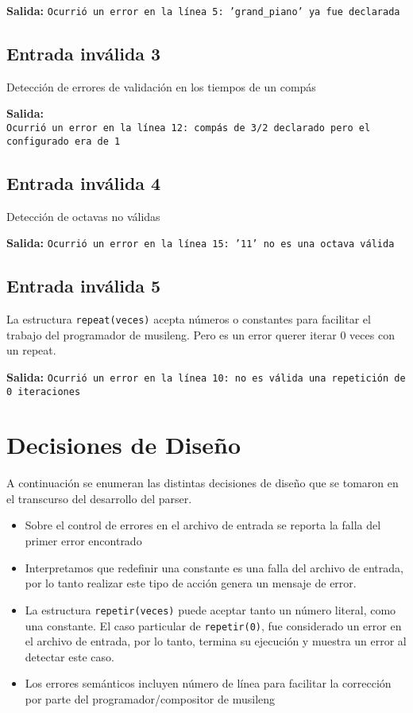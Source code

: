 \documentclass[a4paper,8pt]{article}
\begin{document}
\textbf{Salida:} \texttt{Ocurrió un error en la línea 5: 'grand\_piano' ya fue declarada}

\subsection{Entrada inválida 3}
Detección de errores de validación en los tiempos de un compás
\begin{small}
  
\end{small}

\textbf{Salida:}\\ \texttt{Ocurrió un error en la línea 12: compás de 3/2 declarado pero el configurado era de 1}
\subsection{Entrada inválida 4}
Detección de octavas no válidas
\begin{small}
  
\end{small}

\textbf{Salida:} \texttt{Ocurrió un error en la línea 15: '11' no es una octava válida}

\subsection{Entrada inválida 5}
La estructura \texttt{repeat(veces)} acepta números o constantes para facilitar el trabajo del programador de musileng. Pero es un error querer iterar 0 veces con un repeat.
\begin{small}
  
\end{small}

\textbf{Salida:} \texttt{Ocurrió un error en la línea 10: no es válida una repetición de 0 iteraciones}

\section{Decisiones de Diseño}
A continuación se enumeran las distintas decisiones de diseño que se tomaron en el transcurso del desarrollo del parser.
\begin{itemize}
\item Sobre el control de errores en el archivo de entrada se reporta la falla del primer error encontrado
\item Interpretamos que redefinir una constante es una falla del archivo de entrada, por lo tanto realizar este tipo de acción genera un mensaje de error.
\item La estructura \texttt{repetir(veces){}} puede aceptar tanto un número literal, como una constante. El caso particular de \texttt{repetir(0)}, fue considerado un error en el archivo de entrada, por lo tanto, termina su ejecución y muestra un error al detectar este caso.
\item Los errores semánticos incluyen número de línea para facilitar la corrección por parte del programador/compositor de musileng
\end{itemize}
\end{document}
